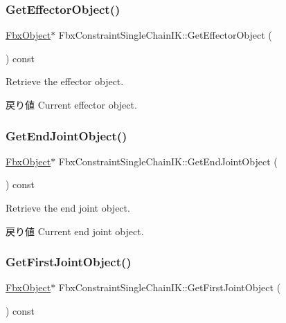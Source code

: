 \subsubsection{\texorpdfstring{Get\+Effector\+Object()}{GetEffectorObject()}}
{\footnotesize\ttfamily \hyperlink{class_fbx_object}{Fbx\+Object}$\ast$ Fbx\+Constraint\+Single\+Chain\+I\+K\+::\+Get\+Effector\+Object (\begin{DoxyParamCaption}{ }\end{DoxyParamCaption}) const}

Retrieve the effector object. \begin{DoxyReturn}{戻り値}
Current effector object. 
\end{DoxyReturn}
\mbox{\label{class_fbx_constraint_single_chain_i_k_a0159badf18fe865398ae2056d86fe074}} 
\subsubsection{\texorpdfstring{Get\+End\+Joint\+Object()}{GetEndJointObject()}}
{\footnotesize\ttfamily \hyperlink{class_fbx_object}{Fbx\+Object}$\ast$ Fbx\+Constraint\+Single\+Chain\+I\+K\+::\+Get\+End\+Joint\+Object (\begin{DoxyParamCaption}{ }\end{DoxyParamCaption}) const}

Retrieve the end joint object. \begin{DoxyReturn}{戻り値}
Current end joint object. 
\end{DoxyReturn}
\mbox{\label{class_fbx_constraint_single_chain_i_k_a0dc8be31ce58d635c933561fd73010f1}} 
\subsubsection{\texorpdfstring{Get\+First\+Joint\+Object()}{GetFirstJointObject()}}
{\footnotesize\ttfamily \hyperlink{class_fbx_object}{Fbx\+Object}$\ast$ Fbx\+Constraint\+Single\+Chain\+I\+K\+::\+Get\+First\+Joint\+Object (\begin{DoxyParamCaption}{ }\end{DoxyParamCaption}) const}


